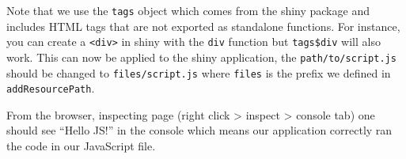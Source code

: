 \documentclass[
]{krantz}
\makeatletter
\newenvironment{Shaded}{\begin{snugshade}}{\end{snugshade}}
\newcommand{\CommentTok}[1]{\textcolor[rgb]{0.37,0.37,0.37}{\textit{#1}}}
\newcommand{\ControlFlowTok}[1]{\textcolor[rgb]{0.27,0.27,0.27}{\textbf{#1}}}
\newcommand{\DataTypeTok}[1]{\textcolor[rgb]{0.27,0.27,0.27}{#1}}
\newcommand{\KeywordTok}[1]{\textcolor[rgb]{0.27,0.27,0.27}{\textbf{#1}}}
\newcommand{\NormalTok}[1]{#1}
\newcommand{\OperatorTok}[1]{\textcolor[rgb]{0.43,0.43,0.43}{\textbf{#1}}}
\newcommand{\StringTok}[1]{\textcolor[rgb]{0.5,0.5,0.5}{#1}}
\newenvironment{kframe}{%
\medskip{}
\setlength{\fboxsep}{.8em}
 \def\at@end@of@kframe{}%
 \ifinner\ifhmode%
  \def\at@end@of@kframe{\end{minipage}}%
  \begin{minipage}{\columnwidth}%
 \fi\fi%
 \def\FrameCommand##1{\hskip\@totalleftmargin \hskip-\fboxsep
 \colorbox{shadecolor}{##1}\hskip-\fboxsep
     \hskip-\linewidth \hskip-\@totalleftmargin \hskip\columnwidth}%
 \MakeFramed {\advance\hsize-\width
   \@totalleftmargin\z@ \linewidth\hsize
   \@setminipage}}%
 {\par\unskip\endMakeFramed%
 \at@end@of@kframe}
\renewenvironment{Shaded}{\begin{kframe}}{\end{kframe}}
\makeatother
\begin{document}
\begin{Shaded}
\end{Shaded}

Note that we use the \texttt{tags} object which comes from the shiny package and includes HTML tags that are not exported as standalone functions. For instance, you can create a \texttt{\textless{}div\textgreater{}} in shiny with the \texttt{div} function but \texttt{tags\$div} will also work. This can now be applied to the shiny application, the \texttt{path/to/script.js} should be changed to \texttt{files/script.js} where \texttt{files} is the prefix we defined in \texttt{addResourcePath}.

\begin{Shaded}
\end{Shaded}

From the browser, inspecting page (right click \textgreater{} inspect \textgreater{} console tab) one should see ``Hello JS!'' in the console which means our application correctly ran the code in our JavaScript file.
\end{document}
